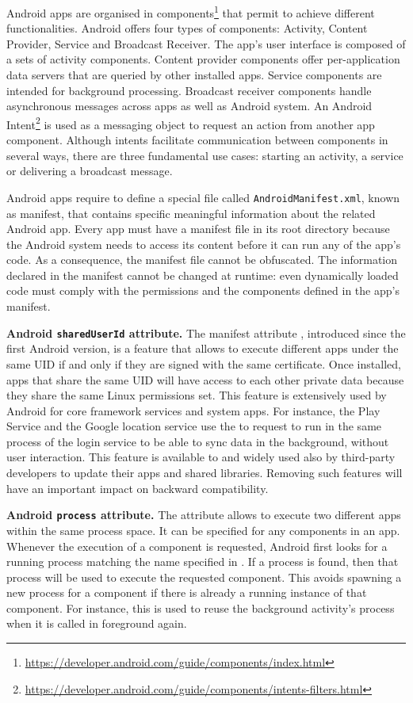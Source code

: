 Android apps are organised in components\footnote{\url{https://developer.android.com/guide/components/index.html}} that permit to achieve different functionalities. Android offers four types of components: Activity,  Content Provider, Service and Broadcast Receiver. The app's user interface is composed of a sets of activity components. Content provider components offer per-application data servers that are queried by other installed apps. Service components are intended for background processing. Broadcast receiver components handle asynchronous messages across apps as well as Android system. An Android Intent\footnote{\url{https://developer.android.com/guide/components/intents-filters.html}} is used as a messaging object to request an action from another app component. Although intents facilitate communication between components in several ways, there are three fundamental use cases: starting an activity, a service or delivering a broadcast message. 


Android apps require to define a special file called \texttt{AndroidManifest.xml}, known as manifest\cite{manifest}, that contains specific meaningful information about the related Android app. Every app must have a manifest file in its root directory because the Android system needs to access its content before it can run any of the app's code. As a consequence, the manifest file cannot be obfuscated. The information declared in the manifest  cannot be changed at runtime: even  dynamically loaded code must comply with the permissions and the components defined in the app's manifest.

\textbf{Android \texttt{sharedUserId} attribute.} The manifest attribute \shared, introduced since the first Android version, is a feature that allows to execute different apps under the same UID if and only if they are signed with the same certificate. Once installed, apps that share the same UID will have access to each other private data because they share the same Linux permissions set. This feature is extensively used by Android for core framework services and system apps. For instance, the Play Service and the Google location service use the \shared to request to run in the same process of the login service to be able to sync data in the background, without  user interaction. This feature is available to and widely used also by third-party developers to update their apps and shared libraries. Removing such features will have  an important impact on backward compatibility.
  
\textbf{Android \texttt{process} attribute.} The attribute \proc allows to execute two different apps within the same process space. It can be specified for any components in an app. Whenever the execution of  a component is requested, Android first looks for a running process matching the name specified in \proc. If a process is found, then that process will be used to execute the requested component. This avoids spawning a new process for a component if there is already a running instance of that component. For instance, this is used to reuse the background activity's process when it is called in foreground again.

